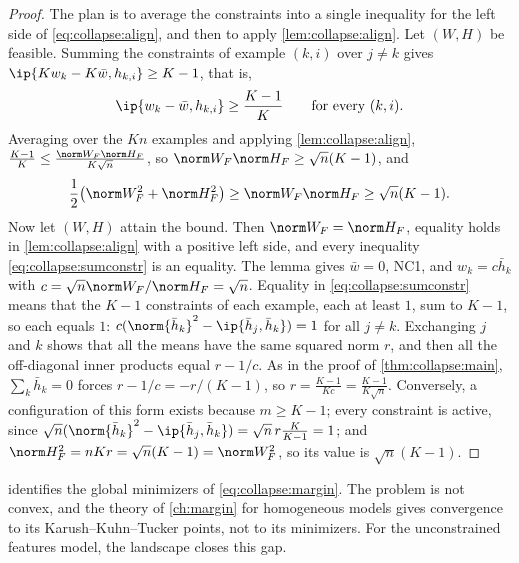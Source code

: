 \begin{refsection}
\begin{proof}
The plan is to average the constraints into a single inequality for the left side of \eqref{eq:collapse:align}, and then to apply \cref{lem:collapse:align}. Let $(W,H)$ be feasible. Summing the constraints of example $(k,i)$ over $j\ne k$ gives $\ip{Kw_k-K\bar w,h_{k,i}}\ge K-1$, that is,
\begin{equation}\label{eq:collapse:sumconstr}
  \ip{w_k-\bar w,h_{k,i}}\ge\frac{K-1}K\qquad\text{for every }(k,i).
\end{equation}
Averaging over the $Kn$ examples and applying \cref{lem:collapse:align}, $\frac{K-1}K\le\frac{\norm W_F\norm H_F}{K\sqrt n}$, so $\norm W_F\norm H_F\ge\sqrt n(K-1)$, and
\[
  \frac12\bigl(\norm W_F^2+\norm H_F^2\bigr)\ge\norm W_F\norm H_F\ge\sqrt n(K-1).
\]
Now let $(W,H)$ attain the bound. Then $\norm W_F=\norm H_F$, equality holds in \cref{lem:collapse:align} with a positive left side, and every inequality \eqref{eq:collapse:sumconstr} is an equality. The lemma gives $\bar w=0$, NC1, and $w_k=c\bar h_k$ with $c=\sqrt n\norm W_F/\norm H_F=\sqrt n$. Equality in \eqref{eq:collapse:sumconstr} means that the $K-1$ constraints of each example, each at least $1$, sum to $K-1$, so each equals $1$: $c(\norm{\bar h_k}^2-\ip{\bar h_j,\bar h_k})=1$ for all $j\ne k$. Exchanging $j$ and $k$ shows that all the means have the same squared norm $r$, and then all the off-diagonal inner products equal $r-1/c$. As in the proof of \cref{thm:collapse:main}, $\sum_k\bar h_k=0$ forces $r-1/c=-r/(K-1)$, so $r=\frac{K-1}{Kc}=\frac{K-1}{K\sqrt n}$. Conversely, a configuration of this form exists because $m\ge K-1$; every constraint is active, since $\sqrt n(\norm{\bar h_k}^2-\ip{\bar h_j,\bar h_k})=\sqrt n\,r\frac K{K-1}=1$; and $\norm H_F^2=nKr=\sqrt n(K-1)=\norm W_F^2$, so its value is $\sqrt n(K-1)$.
\end{proof}

 identifies the global minimizers of \eqref{eq:collapse:margin}. The problem is not convex, and the theory of \cref{ch:margin} for homogeneous models gives convergence to its Karush--Kuhn--Tucker points, not to its minimizers. For the unconstrained features model, the landscape closes this gap.


\end{refsection}
